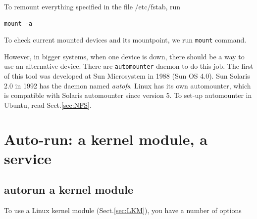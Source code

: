 To remount everything specified in the file /etc/fstab, run 
\begin{verbatim}
mount -a
\end{verbatim}
To check current mounted devices and its mountpoint, we run \verb!mount!
command. 


However, in bigger systems, when one device is down, there should be a way to
use an alternative device. There are \verb!automounter! daemon to do this job.
The first of this tool was developed at Sun Microsystem in 1988 (Sun OS 4.0). Sun
Solaris 2.0 in 1992 has the daemon named {\it autofs}. Linux has its own
automounter, which is compatible with Solaris automounter since version 5. To
set-up automounter in Ubuntu, read Sect.\ref{sec:NFS}.


\section{Auto-run: a kernel module, a service}


  
\subsection{autorun a kernel module}
\label{sec:auto-run-kernel-module}

To use a Linux kernel module (Sect.\ref{sec:LKM}), you have a number of options


